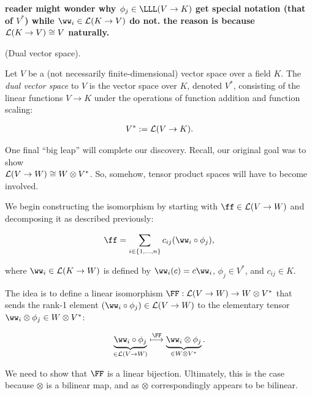 \textbf{reader might wonder why $\phi_j \in \LLL(V \rightarrow K)$ get special notation (that of $V^*$) while $\ww_i \in \LLLL(K \rightarrow V)$ do not. the reason is because $\mathcal{L}(K \rightarrow V) \cong V$ naturally.}

\begin{defn}
\label{ch::motivated_intro::defn::dual_space_1}
    (Dual vector space).
    
    Let $V$ be a (not necessarily finite-dimensional) vector space over a field $K$. The \textit{dual vector space} to $V$ is the vector space over $K$, denoted $V^*$, consisting of the linear functions $V \rightarrow K$ under the operations of function addition and function scaling:
    
    \begin{align*}
        V^* := \mathcal{L}(V \rightarrow K).
    \end{align*}
\end{defn}

\vspace{.5cm}

One final ``big leap'' will complete our discovery. Recall, our original goal was to show \\ ${\mathcal{L}(V \rightarrow W) \cong W \otimes V^*}$. So, somehow, tensor product spaces will have to become involved.

We begin constructing the isomorphism by starting with $\ff \in \LLLL(V \rightarrow W)$ and decomposing it as described previously:

\begin{align*}
    \ff = \sum_{\substack{i \in \{1, ..., n\}}} c_{ij} (\ww_i \circ \phi_j),
\end{align*}

where $\ww_i \in \LLLL(K \rightarrow W)$ is defined by $\ww_i(c) = c \ww_i$, $\phi_j \in V^*$, and $c_{ij} \in K$.

The idea is to define a linear isomorphism $\FF:\LLLL(V \rightarrow W) \rightarrow W \otimes V^*$ that sends the rank-1 element ${(\ww_i \circ \phi_j) \in \LLLL(V \rightarrow W)}$ to the elementary tensor $\ww_i \otimes \phi_j \in W \otimes V^*$:

\begin{align*}
    \underbrace{\ww_i \circ \phi_j}_{\in \LLLL(V \rightarrow W)} \overset{\FF}{\longmapsto} \underbrace{\ww_i \otimes \phi_j}_{\in W \otimes V^*}.
\end{align*}

We need to show that $\FF$ is a linear bijection. Ultimately, this is the case because $\otimes$ is a bilinear map, and as $\otimes$ correspondingly appears to be bilinear.


